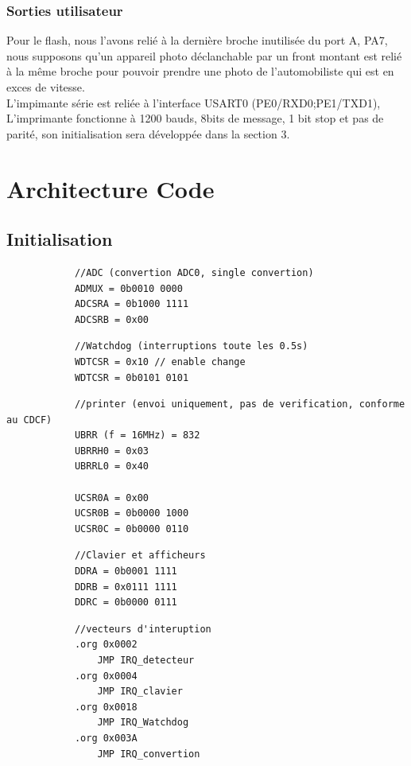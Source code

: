\documentclass[a4paper, 12pt]{article}
\begin{document}
		\subsubsection{Sorties utilisateur}
		Pour le flash, nous l'avons relié à la dernière broche inutilisée du port A, PA7, nous supposons qu'un appareil photo déclanchable par un front montant est relié à la même broche pour pouvoir prendre une photo de l'automobiliste qui est en exces de vitesse.\\
		L'impimante série est reliée à l'interface USART0 (PE0/RXD0;PE1/TXD1), L'imprimante fonctionne à 1200 bauds, 8bits de message, 1 bit stop et pas de parité, son initialisation sera développée dans la section 3.\\
	\newpage
	\section{Architecture Code}
		\subsection{Initialisation}
		\begin{lstlisting}
			//ADC (convertion ADC0, single convertion)
			ADMUX = 0b0010 0000
			ADCSRA = 0b1000 1111
			ADCSRB = 0x00
		\end{lstlisting}
		
		\begin{lstlisting}
			//Watchdog (interruptions toute les 0.5s)
			WDTCSR = 0x10 // enable change
			WDTCSR = 0b0101 0101
		\end{lstlisting}

		\begin{lstlisting}
			//printer (envoi uniquement, pas de verification, conforme au CDCF)
			UBRR (f = 16MHz) = 832
			UBRRH0 = 0x03
			UBRRL0 = 0x40
			
			UCSR0A = 0x00
			UCSR0B = 0b0000 1000
			UCSR0C = 0b0000 0110			
		\end{lstlisting}	
	
		\begin{lstlisting}
			//Clavier et afficheurs
			DDRA = 0b0001 1111
			DDRB = 0x0111 1111
			DDRC = 0b0000 0111
		\end{lstlisting}
		
		\begin{lstlisting}
			//vecteurs d'interuption
			.org 0x0002
				JMP IRQ_detecteur
			.org 0x0004
				JMP IRQ_clavier
			.org 0x0018
				JMP IRQ_Watchdog
			.org 0x003A
				JMP IRQ_convertion
		\end{lstlisting}
\end{document}

